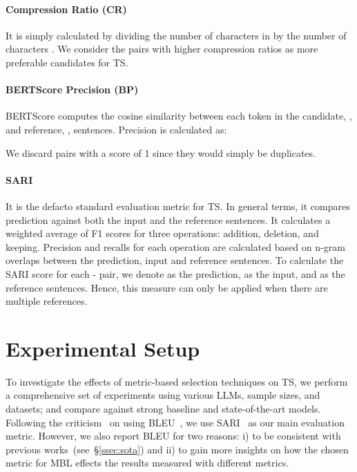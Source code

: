 \documentclass[11pt]{article}
\begin{document}
\paragraph{Compression Ratio (CR)} It is simply calculated by dividing the number of characters in  by the number of characters . We consider the pairs with higher compression ratios as more preferable candidates for TS.

\paragraph{BERTScore Precision (BP)~\citep{bertscore}} BERTScore computes the cosine similarity between each token in the candidate, , and reference, , sentences. Precision is calculated as:

We discard pairs with a score of 1 since they would simply be duplicates.

\paragraph{SARI~\citep{xu-etal-2016-optimizing}} It is the defacto standard evaluation metric for TS. In general terms, it compares prediction against both the input and the reference sentences. It calculates a weighted average of F1 scores for three operations: addition, deletion, and keeping. Precision and recalls for each operation are calculated based on n-gram overlaps between the prediction, input and reference sentences. To calculate the SARI score for each - pair, we denote  as the prediction,  as the input, and  as the reference sentences. Hence, this measure can only be applied when there are multiple references. 





 

\section{Experimental Setup}
\label{sec:setup}
To investigate the effects of metric-based selection techniques on TS, we perform a comprehensive set of experiments using various LLMs, sample sizes, and datasets; and compare against strong baseline and state-of-the-art models. Following the criticism~\cite{sulem-etal-2018-bleu} on using BLEU~\citep{papineni-etal-2002-bleu}, we use SARI~\citep{xu-etal-2016-optimizing} as our main evaluation metric. However, we also report BLEU for two reasons: i) to be consistent with previous works~(see~\S \ref{ssec:sota}) and ii) to gain more insights on how the chosen metric for MBL effects the results measured with different metrics. 
\end{document}
